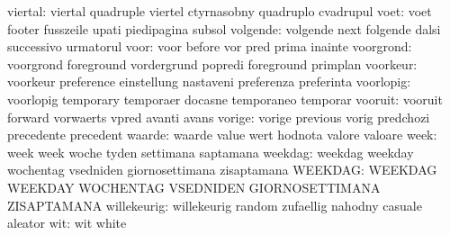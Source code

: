                   viertal: viertal                   quadruple
                           viertel                   ctyrnasobny
                           quadruplo                 cvadrupul
                     voet: voet                      footer
                           fusszeile                 upati
                           piedipagina               subsol
                 volgende: volgende                  next
                           folgende                  dalsi
                           successivo                urmatorul
                     voor: voor                      before
                           vor                       pred
                           prima                     inainte
                voorgrond: voorgrond                 foreground
                           vordergrund               popredi
                           foreground                primplan
                 voorkeur: voorkeur                  preference
                           einstellung               nastaveni
                           preferenza                preferinta
                voorlopig: voorlopig                 temporary
                           temporaer                 docasne
                           temporaneo                temporar
                  vooruit: vooruit                   forward
                           vorwaerts                 vpred
                           avanti                    avans
                   vorige: vorige                    previous
                           vorig                     predchozi
                           precedente                precedent
                   waarde: waarde                    value
                           wert                      hodnota
                           valore                    valoare
                     week: week                      week
                           woche                     tyden
                           settimana                 saptamana
                  weekdag: weekdag                   weekday
                           wochentag                 vsedniden
                           giornosettimana           zisaptamana
                  WEEKDAG: WEEKDAG                   WEEKDAY
                           WOCHENTAG                 VSEDNIDEN
                           GIORNOSETTIMANA           ZISAPTAMANA
              willekeurig: willekeurig               random
                           zufaellig                 nahodny
                           casuale                   aleator
                      wit: wit                       white
